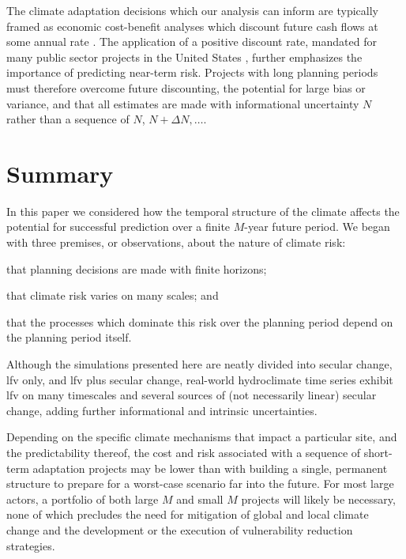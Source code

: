 \documentclass[
  draft,
  linenumbers
]{agujournal2018}
\begin{document}
The climate adaptation decisions which our analysis can inform are typically framed as economic cost-benefit analyses which discount future cash flows at some annual rate \citep{sodastrom:1999,powers:2003}.
The application of a positive discount rate, mandated for many public sector projects in the United States \citep{powers:2003}, further emphasizes the importance of predicting near-term risk.
Projects with long planning periods must therefore overcome future discounting, the potential for large bias or variance, and that all estimates are made with informational uncertainty $N$ rather than a sequence of $N$, $N+\Delta N, \ldots$.

\section{Summary}

In this paper we considered how the temporal structure of the climate affects the potential for successful prediction over a finite $M$-year future period.
We began with three premises, or observations, about the nature of climate risk:
\begin{enumerate*}[label= (\roman*)]
  \item that planning decisions are made with finite horizons;
  \item that climate risk varies on many scales; and
  \item that the processes which dominate this risk over the planning period depend on the planning period itself.
\end{enumerate*}
Although the simulations presented here are neatly divided into secular change, \gls{lfv} only, and \gls{lfv} plus secular change, real-world hydroclimate time series exhibit \gls{lfv} on many timescales and several sources of (not necessarily linear) secular change, adding further informational and intrinsic uncertainties.

Depending on the specific climate mechanisms that impact a particular site, and the predictability thereof, the cost and risk associated with a sequence of short-term adaptation projects may be lower than with building a single, permanent structure to prepare for a worst-case scenario far into the future.
For most large actors, a portfolio of both large $M$ and small $M$ projects will likely be necessary, none of which precludes the need for mitigation of global and local climate change and the development or the execution of vulnerability reduction strategies.

\end{document}
